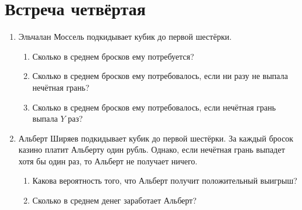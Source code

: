 \documentclass[12pt]{article}
\begin{document}
\newpage
\section{Встреча четвёртая}
\begin{enumerate}
\item Эльчалан Моссель подкидывает кубик до первой шестёрки. 
\begin{enumerate}
    \item Сколько в среднем бросков ему потребуется?
    \item Сколько в среднем бросков ему потребовалось, если ни разу не выпала нечётная грань?
    \item Сколько в среднем бросков ему потребовалось, если нечётная грань выпала $Y$ раз?
\end{enumerate}

\item Альберт Ширяев подкидывает кубик до первой шестёрки. 
За каждый бросок казино платит Альберту один рубль. 
Однако, если нечётная грань выпадет хотя бы один раз, то Альберт не получает ничего. 
\begin{enumerate}
    \item Какова вероятность того, что Альберт получит положительный выигрыш?
    \item Сколько в среднем денег заработает Альберт?
\end{enumerate}

\end{enumerate}
\end{document}
